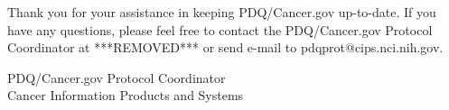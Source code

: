 \documentclass[letterpaper,12pt]{letter}
\begin{document}
Thank you for your assistance in keeping PDQ/Cancer.gov up-to-date.  If you
have any questions, please feel free to contact the PDQ/Cancer.gov Protocol
Coordinator at ***REMOVED*** or send e-mail to pdqprot@cips.nci.nih.gov.

\vspace{12pt}

PDQ/Cancer.gov Protocol Coordinator \\
Cancer Information Products and Systems

\vfill
\end{document}
